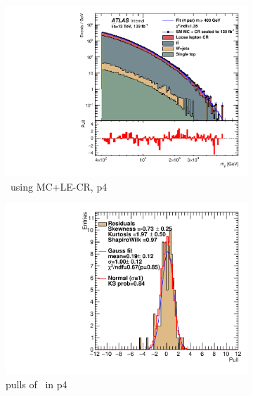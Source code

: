 \begin{figure}[H]
    \centering
    \begin{subfigure}[h]{0.38\linewidth}
    \includegraphics[scale=0.3]{figs/ch6/fit/variable_nosmooth/p4/10PB/output_SMMCplusCR_Mjj_p4.pdf}%
    \caption{\mjj \ using MC+LE-CR, p4}
    \end{subfigure}
    \hfill
    \begin{subfigure}[h]{0.4\linewidth}
    \includegraphics[scale=0.32]{figs/ch6/fit/variable_nosmooth/p4/10PB/pull_SMMCplusCR_Mjj_p4.pdf}%
    \caption{pulls of \mjj \ in p4}
    \end{subfigure}
    \hfill
    \begin{subfigure}[h]{0.38\linewidth}

\end{subfigure}
\end{figure}
